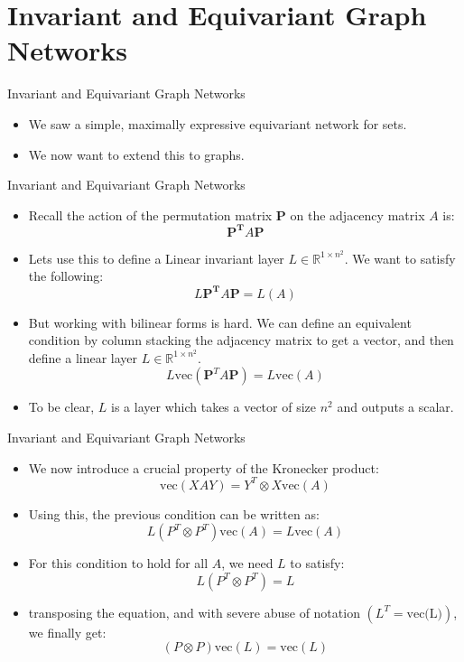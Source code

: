 \documentclass{beamer}
\begin{document}
\section{Invariant and Equivariant Graph Networks}

\begin{frame}{Invariant and Equivariant Graph Networks}
    \begin{itemize}
        \setlength{\itemsep}{\fill}
        \item We saw a simple, maximally expressive equivariant network for sets.
        \item We now want to extend this to graphs.
    \end{itemize}
\end{frame}
\begin{frame}{Invariant and Equivariant Graph Networks}
    \begin{itemize}
        \setlength{\itemsep}{\fill}
        \item Recall the action of the permutation matrix $\boldsymbol{P}$ on the adjacency matrix $A$ is:
        \[\boldsymbol{P^T}A\boldsymbol{P}\]
        \item Lets use this to define a Linear invariant layer $L \in \mathbb{R}^{1 \times n^2}$. We want to satisfy the following:
        \[ L\boldsymbol{P^T}A\boldsymbol{P} = L(A) \]
        \item But working with bilinear forms is hard. We can define an equivalent condition by column stacking the adjacency matrix to get a vector, and then define a linear layer $L \in \mathbb{R}^{1 \times n^2}$.
        \[ L\text{vec}(\boldsymbol{P}^T A\boldsymbol{P}) = L\text{vec}(A) \]
        \item To be clear, $L$ is a layer which takes a vector of size $n^2$ and outputs a scalar.
    \end{itemize}
\end{frame}
\begin{frame}{Invariant and Equivariant Graph Networks}
    \begin{itemize}
        \setlength{\itemsep}{\fill}
        \item We now introduce a crucial property of the Kronecker product:
        \[ \text{vec}(XAY)= Y^T\otimes X\text{vec}(A)\]
        \item Using this, the previous condition can be written as:
        \[ L(P^T\otimes P^T)\text{vec}(A) = L\text{vec}(A) \]
        \item For this condition to hold for all $A$, we need $L$ to satisfy:
        \[ L(P^T\otimes P^T) = L \]
        \item transposing the equation, and with severe abuse of notation $(L^T = \text{vec(L)})$, we finally get:
        \[ (P\otimes P)\text{vec}(L) = \text{vec}(L) \]
    \end{itemize}
\end{frame}
\end{document}
